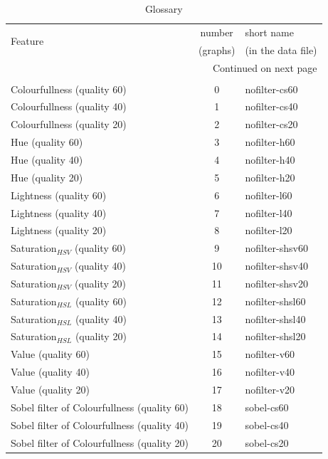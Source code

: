 \documentclass[11pt,a4paper,draft]{report}
\begin{document}
\begin{center}
\footnotesize
\begin{longtable}{|l|c|l|}
\toprule
\multirow{2}{*}{Feature} & number   & short name         \\
                         & (graphs) & (in the data file) \\
\midrule
\endhead

\midrule
\multicolumn{3}{r}{{Continued on next page}} \\
\cmidrule{2-3}
\endfoot

\bottomrule
\caption{Glossary}
\label{tab:glossary}
\endlastfoot

\midrule
\multicolumn{3}{c}{Komogorov Complexity for$\ldots$} \\
\midrule
Colourfullness (quality 60) & 0 & nofilter-cs60 \\
Colourfullness (quality 40) & 1 & nofilter-cs40 \\
Colourfullness (quality 20) & 2 & nofilter-cs20 \\
Hue (quality 60) & 3 & nofilter-h60 \\
Hue (quality 40) & 4 & nofilter-h40 \\
Hue (quality 20) & 5 & nofilter-h20 \\
Lightness (quality 60) & 6 & nofilter-l60 \\
Lightness (quality 40) & 7 & nofilter-l40 \\
Lightness (quality 20) & 8 & nofilter-l20 \\
Saturation$_{HSV}$ (quality 60) & 9 & nofilter-shsv60 \\
Saturation$_{HSV}$ (quality 40) & 10 & nofilter-shsv40 \\
Saturation$_{HSV}$ (quality 20) & 11 & nofilter-shsv20 \\
Saturation$_{HSL}$ (quality 60) & 12 & nofilter-shsl60 \\
Saturation$_{HSL}$ (quality 40) & 13 & nofilter-shsl40 \\
Saturation$_{HSL}$ (quality 20) & 14 & nofilter-shsl20 \\
Value (quality 60) & 15 & nofilter-v60 \\
Value (quality 40) & 16 & nofilter-v40 \\
Value (quality 20) & 17 & nofilter-v20 \\
Sobel filter of Colourfullness (quality 60) & 18 & sobel-cs60 \\
Sobel filter of Colourfullness (quality 40) & 19 & sobel-cs40 \\
Sobel filter of Colourfullness (quality 20) & 20 & sobel-cs20 \\

\end{longtable}
\end{center}
\end{document}
